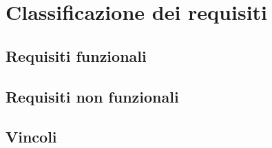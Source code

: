 \section{Classificazione dei requisiti}
	\subsection{Requisiti funzionali}
	\subsection{Requisiti non funzionali}
	\subsection{Vincoli}